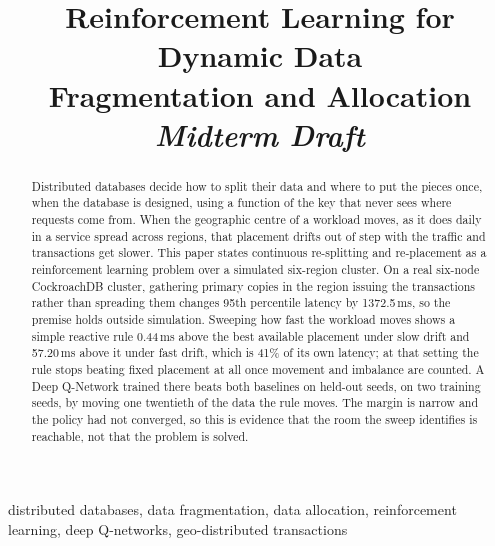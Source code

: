 \documentclass[conference]{IEEEtran}
\begin{document}
\title{Reinforcement Learning for Dynamic Data\\
Fragmentation and Allocation\\
\large\textit{Midterm Draft}}

\author{
}

\maketitle

\begin{abstract}
Distributed databases decide how to split their data and where to put the
pieces once, when the database is designed, using a function of the key that
never sees where requests come from. When the geographic centre of a workload
moves, as it does daily in a service spread across regions, that placement
drifts out of step with the traffic and transactions get slower. This paper
states continuous re-splitting and re-placement as a reinforcement learning
problem over a simulated six-region cluster. On a real six-node CockroachDB
cluster, gathering primary copies in the region issuing the transactions
rather than spreading them changes 95th percentile latency by 1372.5\,ms, so
the premise holds outside simulation. Sweeping how fast the workload moves
shows a simple reactive rule 0.44\,ms above the best available placement under
slow drift and 57.20\,ms above it under fast drift, which is 41\% of its own
latency; at that setting the rule stops beating fixed placement at all once
movement and imbalance are counted. A Deep Q-Network trained there beats both
baselines on held-out seeds, on two training seeds, by moving one twentieth of
the data the rule moves. The margin is narrow and the policy had not
converged, so this is evidence that the room the sweep identifies is
reachable, not that the problem is solved.
\end{abstract}

\begin{IEEEkeywords}
distributed databases, data fragmentation, data allocation, reinforcement
learning, deep Q-networks, geo-distributed transactions
\end{IEEEkeywords}












\end{document}
